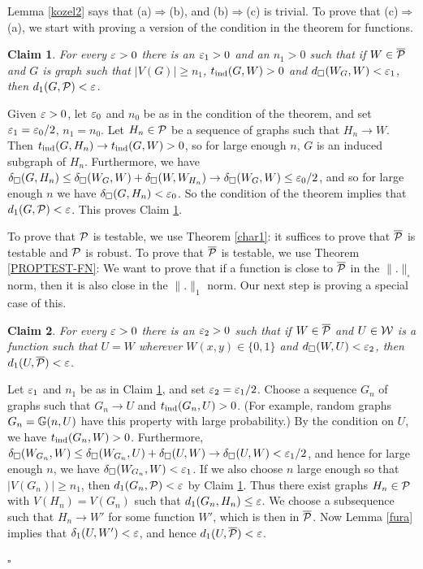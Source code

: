 \documentclass{article}
\newtheorem{claim}{Claim}[theorem]
\newenvironment{proof}{\medskip\noindent{\bf Proof. }}{\hfill$\square$\medskip}
\begin{document}
\begin{proof}
Lemma \ref{kozel2} says that (a)$\Rightarrow$(b), and
(b)$\Rightarrow$(c) is trivial. To prove that (c)$\Rightarrow$(a), we
start with proving a version of the condition in the theorem for
functions.

\begin{claim}\label{FN-SAMPLE}
For every $\varepsilon>0$ there is an $\varepsilon_1>0$ and an $n_1>0$ such that if
$W\in\overline{\mathcal{P}}$ and $G$ is graph such that $|V(G)|\ge n_1$,
$t_{\rm ind}(G,W)>0$ and $d_\square(W_G,W)<\varepsilon_1$, then
$d_1(G,\mathcal{P})<\varepsilon$.
\end{claim}

Given $\varepsilon>0$, let $\varepsilon_0$ and $n_0$ be as in the condition of the
theorem, and set $\varepsilon_1=\varepsilon_0/2$, $n_1=n_0$. Let $H_n\in\mathcal{P}$ be a
sequence of graphs such that $H_n\to W$. Then $t_{\rm ind}(G,H_n)\to
t_{\rm ind}(G,W)>0$, so for large enough $n$, $G$ is an induced subgraph
of $H_n$. Furthermore, we have $\delta_\square(G,H_n)\le
\delta_\square(W_G,W)
+\delta_\square(W,W_{H_n})\to\delta_\square(W_G,W)\le\varepsilon_0/2$, and
so for large enough $n$ we have $\delta_\square(G,H_n)<\varepsilon_0$. So
the condition of the theorem implies that $d_1(G,\mathcal{P})<\varepsilon$. This
proves Claim \ref{FN-SAMPLE}.

To prove that $\mathcal{P}$ is testable, we use Theorem \ref{char1}: it
suffices to prove that $\overline{\mathcal{P}}$ is testable and $\mathcal{P}$ is
robust. To prove that $\overline{\mathcal{P}}$ is testable, we use Theorem
\ref{PROPTEST-FN}: We want to prove that if a function is close to
$\overline{\mathcal{P}}$ in the $\|.\|_\square$ norm, then it is also close
in the $\|.\|_1$ norm. Our next step is proving a special case of
this.

\begin{claim}\label{W-FLEX}
For every $\varepsilon>0$ there is an $\varepsilon_2>0$ such that if
$W\in\overline{\mathcal{P}}$ and $U\in\mathcal{W}$ is a function such that $U=W$
wherever $W(x,y)\in\{0,1\}$ and $d_\square(W,U)<\varepsilon_2$, then
$d_1(U,\overline{\mathcal{P}})<\varepsilon$.
\end{claim}

Let $\varepsilon_1$ and $n_1$ be as in Claim \ref{FN-SAMPLE}, and set
$\varepsilon_2=\varepsilon_1/2$. Choose a sequence $G_n$ of graphs such that
$G_n\to U$ and $t_{\rm ind}(G_n,U)>0$. (For example, random graphs
$G_n={\mathbb G}(n,U)$ have this property with large probability.) By the
condition on $U$, we have $t_{\rm ind}(G_n,W)>0$. Furthermore,
$\delta_\square(W_{G_n},W)\le
\delta_\square(W_{G_n},U)+
\delta_\square(U,W) \to \delta_\square(U,W) < \varepsilon_1/2$, and hence
for large enough $n$, we have $\delta_\square(W_{G_n},W)<\varepsilon_1$. If
we also choose $n$ large enough so that $|V(G_n)|\ge n_1$, then
$d_1(G_n,\mathcal{P})<\varepsilon$ by Claim \ref{FN-SAMPLE}. Thus there exist graphs
$H_n\in\mathcal{P}$ with $V(H_n)=V(G_n)$ such that $d_1(G_n,H_n)\le \varepsilon$. We
choose a subsequence such that $H_n\to W'$ for some function $W'$,
which is then in $\overline{\mathcal{P}}$. Now Lemma \ref{fura} implies that
$\delta_1(U,W')< \varepsilon$, and hence $d_1(U, \overline{\mathcal{P}})<\varepsilon$.


\end{proof}
\end{document}
